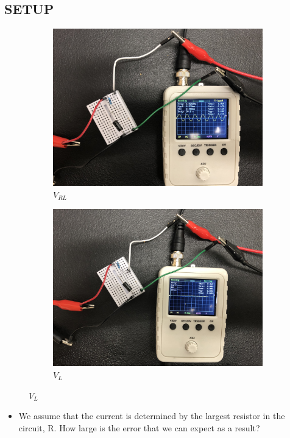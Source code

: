 \documentclass{article}
\def\F#1{\(#1\)}
\begin{document}
\begin{center}
  \subsection*{SETUP}
  \begin{figure}[!htp]
    \begin{subfigure}{0.5\textwidth}
    \includegraphics[scale=0.066]{V_RL.jpeg}
    \caption*{\F{V_{RL}}}\label{fig:subim1}
    \end{subfigure}
    \begin{subfigure}{0.5\textwidth}
    \includegraphics[scale=0.066]{V_L.jpeg}
    \caption*{\F{V_{L}}}\label{fig:subim2}
    \end{subfigure}
  \end{figure}
\end{center}

\begin{itemize}
  \item We assume that the current is determined by the largest resistor in the circuit, R. How large is the error that we can expect as a result?
\end{itemize}
\end{document}
